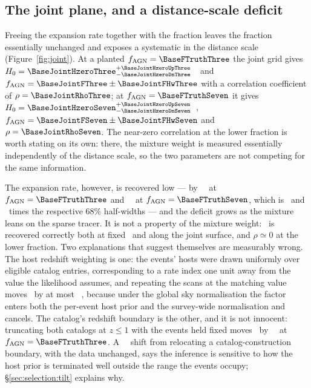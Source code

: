 

\subsection{The joint plane, and a distance-scale deficit}
\label{sec:fraction:joint}

Freeing the expansion rate together with the fraction leaves the fraction
essentially unchanged and exposes a systematic in the distance scale
(Figure~\ref{fig:joint}). At a planted $\fagn = \BaseFTruthThree$ the joint grid
gives $\Hz = \BaseJointHzeroThree^{+\BaseJointHzeroUpThree}_{-\BaseJointHzeroDnThree}$~\kmsmpc\
and $\fagn = \BaseJointFThree \pm \BaseJointFHwThree$ with a correlation
coefficient of $\rho = \BaseJointRhoThree$; at $\fagn = \BaseFTruthSeven$ it
gives $\Hz = \BaseJointHzeroSeven^{+\BaseJointHzeroUpSeven}_{-\BaseJointHzeroDnSeven}$~\kmsmpc,
$\fagn = \BaseJointFSeven \pm \BaseJointFHwSeven$ and
$\rho = \BaseJointRhoSeven$. The near-zero correlation at the lower fraction is
worth stating on its own: there, the mixture weight is measured essentially
independently of the distance scale, so the two parameters are not competing for
the same information.

The expansion rate, however, is recovered low --- by
\BaseJointHzeroOffAbsThree~\kmsmpc\ at $\fagn = \BaseFTruthThree$ and
\BaseJointHzeroOffAbsSeven~\kmsmpc\ at $\fagn = \BaseFTruthSeven$, which is
\BaseJointHzeroSigThree\ and \BaseJointHzeroSigSeven\ times the respective 68\%
half-widths --- and the deficit grows as the mixture leans on the sparse tracer.
It is not a property of the mixture weight: \fagn\ is recovered correctly both
at fixed \Hz\ and along the joint surface, and $\rho \simeq 0$ at the lower
fraction. Two explanations that suggest themselves are measurably wrong. The
host redshift weighting is one: the events' hosts were drawn uniformly over
eligible catalog entries, corresponding to a rate index one unit away from the
value the likelihood assumes, and repeating the scans at the matching value
moves \Hz\ by at most \BaseGammaShiftMax~\kmsmpc, because under the global sky
normalisation the factor enters both the per-event host prior and the
survey-wide normalisation and cancels. The catalog's redshift boundary is the
other, and it is not innocent: truncating both catalogs at $z \le 1$ with the
events held fixed moves \Hz\ by \BaseEdgeShiftThree~\kmsmpc\ at
$\fagn = \BaseFTruthThree$. A \BaseEdgeShiftAbsThree~\kmsmpc\ shift from
relocating a catalog-construction boundary, with the data unchanged, says the
inference is sensitive to how the host prior is terminated well outside the
range the events occupy; \S\ref{sec:selection:tilt} explains why.

